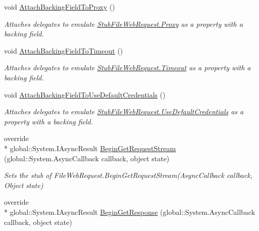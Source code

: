 \begin{DoxyCompactItemize}
void \hyperlink{class_system_1_1_net_1_1_fakes_1_1_stub_file_web_request_a4e43188a33123345f019fd43d7889711}{Attach\-Backing\-Field\-To\-Proxy} ()
\begin{DoxyCompactList}\small\item\em Attaches delegates to emulate \hyperlink{class_system_1_1_net_1_1_fakes_1_1_stub_file_web_request_a089f51a9610862989e4e08e6c76f996b}{Stub\-File\-Web\-Request.\-Proxy} as a property with a backing field.\end{DoxyCompactList}\item 
void \hyperlink{class_system_1_1_net_1_1_fakes_1_1_stub_file_web_request_a30477e077378b15aefaa8571597ffe73}{Attach\-Backing\-Field\-To\-Timeout} ()
\begin{DoxyCompactList}\small\item\em Attaches delegates to emulate \hyperlink{class_system_1_1_net_1_1_fakes_1_1_stub_file_web_request_a15629b94d0e25660313dfd3f12a6a381}{Stub\-File\-Web\-Request.\-Timeout} as a property with a backing field.\end{DoxyCompactList}\item 
void \hyperlink{class_system_1_1_net_1_1_fakes_1_1_stub_file_web_request_a4da23ddbf969a378de153b18e98641b3}{Attach\-Backing\-Field\-To\-Use\-Default\-Credentials} ()
\begin{DoxyCompactList}\small\item\em Attaches delegates to emulate \hyperlink{class_system_1_1_net_1_1_fakes_1_1_stub_file_web_request_aee70eb27bf80bd7c511afcea9e0dada0}{Stub\-File\-Web\-Request.\-Use\-Default\-Credentials} as a property with a backing field.\end{DoxyCompactList}\item 
override \\*
global\-::\-System.\-I\-Async\-Result \hyperlink{class_system_1_1_net_1_1_fakes_1_1_stub_file_web_request_ab3cbcfc95c0c021538faf287d9d188fc}{Begin\-Get\-Request\-Stream} (global\-::\-System.\-Async\-Callback callback, object state)
\begin{DoxyCompactList}\small\item\em Sets the stub of File\-Web\-Request.\-Begin\-Get\-Request\-Stream(\-Async\-Callback callback, Object state)\end{DoxyCompactList}\item 
override \\*
global\-::\-System.\-I\-Async\-Result \hyperlink{class_system_1_1_net_1_1_fakes_1_1_stub_file_web_request_ae8143a81f447f96f562f71d4dcdd3a16}{Begin\-Get\-Response} (global\-::\-System.\-Async\-Callback callback, object state)

\end{DoxyCompactItemize}
